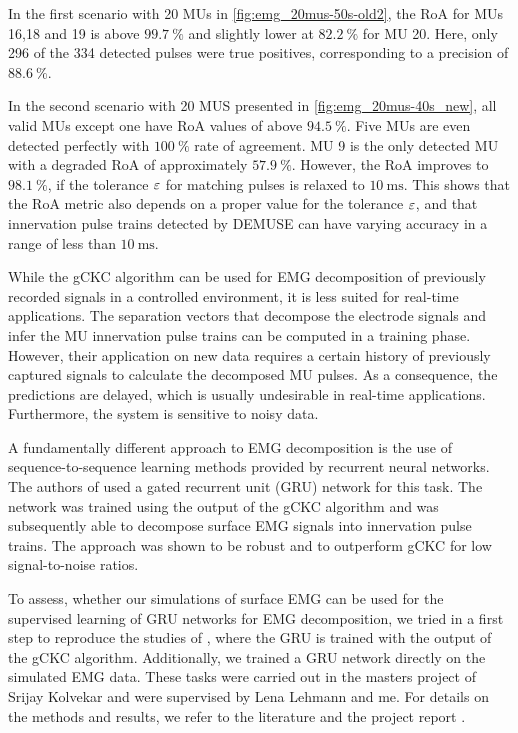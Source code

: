 In the first scenario with 20 MUs in \cref{fig:emg_20mus-50s-old2}, the RoA for MUs 16,18 and 19 is above $\SI{99.7}{\percent}$ and slightly lower at $\SI{82.2}{\percent}$ for MU 20. Here, only 296 of the 334 detected pulses were true positives, corresponding to a precision of $\SI{88.6}{\percent}$.
 
In the second scenario with 20 MUS presented in \cref{fig:emg_20mus-40s_new}, all valid MUs except one have RoA values of above $\SI{94.5}{\percent}$. Five MUs are even detected perfectly with $\SI{100}{\percent}$ rate of agreement. MU 9 is the only detected MU with a degraded RoA of approximately $\SI{57.9}{\percent}$. However, the RoA improves to $\SI{98.1}{\percent}$, if the tolerance $\varepsilon$ for matching pulses is relaxed to $\SI{10}{\ms}$. This shows that the RoA metric also depends on a proper value for the tolerance $\varepsilon$, and that innervation pulse trains detected by DEMUSE can have varying accuracy in a range of less than $\SI{10}{\ms}$.
 
 
While the gCKC algorithm can be used for EMG decomposition of previously recorded signals in a controlled environment, it is less suited for real-time applications. The separation vectors that decompose the electrode signals and infer the MU innervation pulse trains can be computed in a training phase. 
However, their application on new data requires a certain history of previously captured signals to calculate the decomposed MU pulses. As a consequence, the predictions are delayed, which is usually undesirable in real-time applications. Furthermore, the system is sensitive to noisy data. 

A fundamentally different approach to EMG decomposition is the use of sequence-to-sequence learning methods provided by recurrent neural networks. The authors of \cite{Clarke2021} used a gated recurrent unit (GRU) network for this task. The network was trained using the output of the gCKC algorithm and was subsequently able to decompose surface EMG signals into innervation pulse trains. The approach was shown to be robust and to outperform gCKC for low signal-to-noise ratios.

To assess, whether our simulations of surface EMG can be used for the supervised learning of GRU networks for EMG decomposition, we tried in a first step to reproduce the studies of \cite{Clarke2021}, where the GRU is trained with the output of the gCKC algorithm. Additionally, we trained a GRU network directly on the simulated EMG data. These tasks were carried out in the masters project of Srijay Kolvekar and were supervised by Lena Lehmann and me. For details on the methods and results, we refer to the literature \cite{Clarke2021} and the project report \cite{Srijay}.


